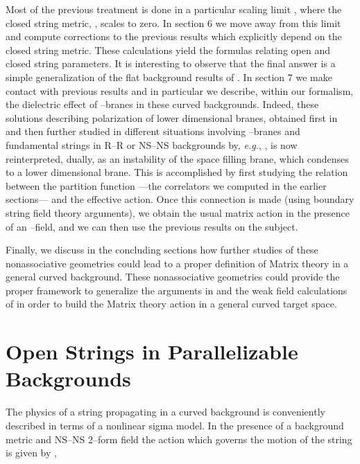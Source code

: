 \documentclass[a4paper,11pt]{article}
\begin{document}
Most of the previous treatment is done in a particular \coordHE{}
scaling limit \cite{Seiberg-Witten}, where the closed string metric, \coordHE{},
scales to zero. In section 6 we move away from this limit and compute
corrections to the previous results which explicitly depend on the closed
string metric. These calculations yield the formulas relating open and
closed string parameters. It is interesting to observe that the final
answer is a simple generalization of the flat background results of
\cite{CLNY, Schomerus, Seiberg-Witten}. In section 7 we make contact with
previous results and in particular we describe, within our formalism, the
dielectric effect of \coordHE{}--branes \cite{Myers} in these curved backgrounds.
Indeed, these solutions describing polarization of lower dimensional
branes, obtained first in \cite{Myers} and then further studied in
different situations involving \coordHE{}--branes and fundamental strings in R--R
or NS--NS backgrounds by, \textit{e.g.}, \cite{CMT, Schiappa, MTR, JMR,
DTV, Kluson, Lozano}, is now reinterpreted, dually, as an instability of
the space filling brane, which condenses to a lower dimensional brane.
This is accomplished by first studying the relation between the partition
function ---the correlators we computed in the earlier sections--- and the
effective action. Once this connection is made (using boundary string field
theory arguments), we obtain the usual matrix action in the presence of an
\coordHE{}--field, and we can then use the previous results on the subject.

Finally, we discuss in the concluding sections how further studies of
these nonassociative geometries could lead to a proper definition of Matrix
theory \cite{Witten-1, BFSS, DHN, Sen, Seiberg} in a general curved
background. These nonassociative geometries could provide the proper
framework to generalize the arguments in \cite{Douglas-Talk, Douglas-1,
DKO} and the weak field calculations of \cite{Taylor-Raamsdonk-1, DNP} in
order to build the Matrix theory action in a general curved target space.


\section{Open Strings in Parallelizable Backgrounds}


The physics of a string propagating in a curved background is conveniently
described in terms of a nonlinear sigma model. In the presence of a
background metric \coordHE{} and NS--NS 2--form field \coordHE{} the action which governs the motion of the string is
given by \cite{AFM, Fradkin-Tseytlin, BCZ, ACNY, CLNY},
\end{document}
